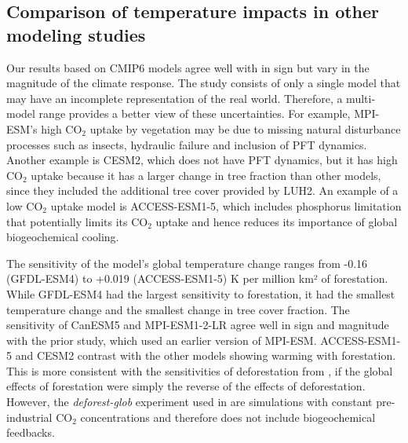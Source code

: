 \documentclass[draft]{agujournal2019}
\begin{document}
\subsection{Comparison of temperature impacts in other modeling studies}

Our results based on CMIP6 models agree well with \cite{sonntag_quantifying_2018} in sign but vary in the magnitude of the climate response.
The  study consists of only a single model that may have an incomplete representation of the real world.
Therefore, a multi-model range provides a better view of these uncertainties.
For example, MPI-ESM's high CO$_2$ uptake by vegetation may be due to missing natural disturbance processes such as insects, hydraulic failure and inclusion of PFT dynamics.
Another example is CESM2, which does not have PFT dynamics, but it has high CO$_2$ uptake because it has a larger change in tree fraction than other models, since they included the additional tree cover provided by LUH2.
An example of a low CO$_2$ uptake model is ACCESS-ESM1-5, which includes phosphorus limitation that potentially limits its CO$_2$ uptake and hence reduces its importance of global biogeochemical cooling.

The sensitivity of the model's global temperature change ranges from -0.16 (GFDL-ESM4) to +0.019 (ACCESS-ESM1-5) K per million km² of forestation.
While GFDL-ESM4 had the largest sensitivity to forestation, it had the smallest temperature change and the smallest change in tree cover fraction.
The sensitivity of CanESM5 and MPI-ESM1-2-LR agree well in sign and magnitude with the prior  study, which used an earlier version of MPI-ESM.
ACCESS-ESM1-5 and CESM2 contrast with the other models showing warming with forestation.
This is more consistent with the sensitivities of deforestation from , if the global effects of forestation were simply the reverse of the effects of deforestation.
However, the \textit{deforest-glob} experiment used in  are simulations with constant pre-industrial CO$_2$ concentrations and therefore does not include biogeochemical feedbacks.
\end{document}
